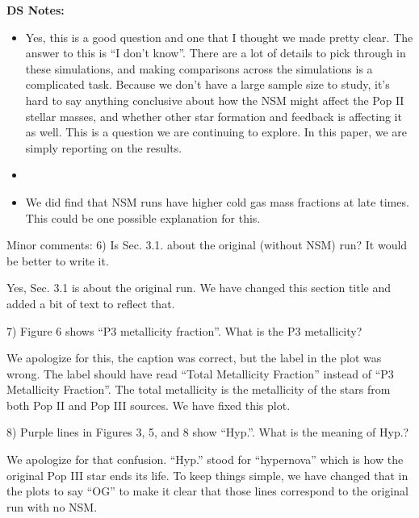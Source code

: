 \documentclass[11pt]{article}
\begin{document}
\textbf{DS Notes:}
\begin{itemize}
    \item Yes, this is a good question and one that I thought we made pretty clear. The answer to this is ``I don't know''. There are a lot of details to pick through in these simulations, and making comparisons across the simulations is a complicated task. Because we don't have a large sample size to study, it's hard to say anything conclusive about how the NSM might affect the Pop II stellar masses, and whether other star formation and feedback is affecting it as well. This is a question we are continuing to explore. In this paper, we are simply reporting on the results.
    \item {}
    \item We did find that NSM runs have higher cold gas mass fractions at late times. This could be one possible explanation for this.
\end{itemize}

\begin{tcolorbox}[colback={lightgray}]
    Minor comments:
    6)      Is Sec. 3.1. about the original (without NSM) run? It would be better to write it.
\end{tcolorbox}

Yes, Sec. 3.1 is about the original run. We have changed this section title and added a bit of text to reflect that.

\begin{tcolorbox}[colback={lightgray}]
    7)      Figure 6 shows “P3 metallicity fraction”. What is the P3 metallicity?
\end{tcolorbox}

We apologize for this, the caption was correct, but the label in the plot was wrong. The label should have read ``Total Metallicity Fraction'' instead of ``P3 Metallicity Fraction''. The total metallicity is the metallicity of the stars from both Pop II and Pop III sources. We have fixed this plot.

\begin{tcolorbox}[colback={lightgray}]
    8)      Purple lines in Figures 3, 5, and 8 show “Hyp.”. What is the meaning of Hyp.?
\end{tcolorbox}

We apologize for that confusion. ``Hyp.'' stood for ``hypernova'' which is how the original Pop III star ends its life. To keep things simple, we have changed that in the plots to say ``OG'' to make it clear that those lines correspond to the original run with no NSM.  
\end{document}
